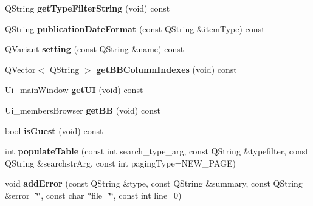 \begin{DoxyCompactItemize}
\item 
Q\+String {\bfseries get\+Type\+Filter\+String} (void) const \hypertarget{classbiblioteq_a8c232e081602550c2eaa584d7d532f64}{}\label{classbiblioteq_a8c232e081602550c2eaa584d7d532f64}

\item 
Q\+String {\bfseries publication\+Date\+Format} (const Q\+String \&item\+Type) const \hypertarget{classbiblioteq_a1ce8f17d9436b9d049dd3e4a39ec5ecd}{}\label{classbiblioteq_a1ce8f17d9436b9d049dd3e4a39ec5ecd}

\item 
Q\+Variant {\bfseries setting} (const Q\+String \&name) const \hypertarget{classbiblioteq_a329db5ca10eda04fad3fe09ce6d36bad}{}\label{classbiblioteq_a329db5ca10eda04fad3fe09ce6d36bad}

\item 
Q\+Vector$<$ Q\+String $>$ {\bfseries get\+B\+B\+Column\+Indexes} (void) const \hypertarget{classbiblioteq_a78abafa3af180949743cfe885eade850}{}\label{classbiblioteq_a78abafa3af180949743cfe885eade850}

\item 
Ui\+\_\+main\+Window {\bfseries get\+UI} (void) const \hypertarget{classbiblioteq_adec28d45f9ddc0060cc60a9f561a477f}{}\label{classbiblioteq_adec28d45f9ddc0060cc60a9f561a477f}

\item 
Ui\+\_\+members\+Browser {\bfseries get\+BB} (void) const \hypertarget{classbiblioteq_a5097015273e31dfd3946440d13cc69d8}{}\label{classbiblioteq_a5097015273e31dfd3946440d13cc69d8}

\item 
bool {\bfseries is\+Guest} (void) const \hypertarget{classbiblioteq_a321d120a6ff753f3e5240fe40e1e746f}{}\label{classbiblioteq_a321d120a6ff753f3e5240fe40e1e746f}

\item 
int {\bfseries populate\+Table} (const int search\+\_\+type\+\_\+arg, const Q\+String \&typefilter, const Q\+String \&searchstr\+Arg, const int paging\+Type=N\+E\+W\+\_\+\+P\+A\+GE)\hypertarget{classbiblioteq_ae13409ea2011c0dde922530b1fbba8d0}{}\label{classbiblioteq_ae13409ea2011c0dde922530b1fbba8d0}

\item 
void {\bfseries add\+Error} (const Q\+String \&type, const Q\+String \&summary, const Q\+String \&error=\char`\"{}\char`\"{}, const char $\ast$file=\char`\"{}\char`\"{}, const int line=0)\hypertarget{classbiblioteq_a6773c729ae670a40b804ad9a5609ffb2}{}\label{classbiblioteq_a6773c729ae670a40b804ad9a5609ffb2}


\end{DoxyCompactItemize}
